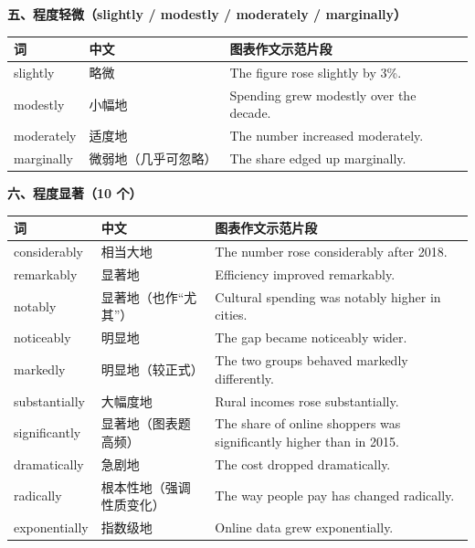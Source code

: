 \documentclass[11pt,a4paper]{ctexart}
\begin{document}
\par\addvspace{5pt}\noindent\textbf{五、程度轻微（slightly / modestly / moderately / marginally）}\par\addvspace{2pt}
\begin{longtable}{L{2.9cm}L{1.9cm}L{10.9cm}}
\toprule
\textbf{词} & \textbf{中文} & \textbf{图表作文示范片段} \\
\midrule
\endhead
slightly & 略微 & The figure rose slightly by 3\%. \\
modestly & 小幅地 & Spending grew modestly over the decade. \\
moderately & 适度地 & The number increased moderately. \\
marginally & 微弱地（几乎可忽略） & The share edged up marginally. \\
\bottomrule
\end{longtable}

\par\addvspace{5pt}\noindent\textbf{六、程度显著（10 个）}\par\addvspace{2pt}
\begin{longtable}{L{2.9cm}L{1.9cm}L{10.9cm}}
\toprule
\textbf{词} & \textbf{中文} & \textbf{图表作文示范片段} \\
\midrule
\endhead
considerably & 相当大地 & The number rose considerably after 2018. \\
remarkably & 显著地 & Efficiency improved remarkably. \\
notably & 显著地（也作“尤其”） & Cultural spending was notably higher in cities. \\
noticeably & 明显地 & The gap became noticeably wider. \\
markedly & 明显地（较正式） & The two groups behaved markedly differently. \\
substantially & 大幅度地 & Rural incomes rose substantially. \\
significantly & 显著地（图表题高频） & The share of online shoppers was significantly higher than in 2015. \\
dramatically & 急剧地 & The cost dropped dramatically. \\
radically & 根本性地（强调性质变化） & The way people pay has changed radically. \\
exponentially & 指数级地 & Online data grew exponentially. \\
\bottomrule
\end{longtable}
\end{document}
